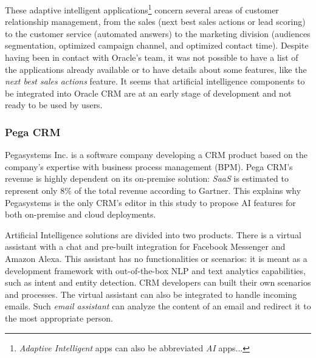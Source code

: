 These adaptive intelligent applications\footnote{\textit{Adaptive Intelligent} apps can also be abbreviated \textit{AI} apps...} concern several areas of customer relationship management, from the sales (next best sales actions or lead scoring) to the customer service (automated answers) to the marketing division (audiences segmentation, optimized campaign channel, and optimized contact time). Despite having been in contact with Oracle's team, it was not possible to have a list of the applications already available or to have details about some features, like the \textit{next best sales actions} feature. It seems that artificial intelligence components to be integrated into Oracle CRM are at an early stage of development and not ready to be used by users. 


\subsubsection*{Pega CRM}
Pegasystems Inc. is a software company developing a CRM product based on the company's expertise with business process management (BPM). Pega CRM's revenue is highly dependent on its on-premise solution: \textit{SaaS} is estimated to represent only 8\% of the total revenue according to Gartner. This explains why Pegasystems is the only CRM's editor in this study to propose AI features for both on-premise and cloud deployments.

Artificial Intelligence solutions are divided into two products. There is a virtual assistant with a chat and pre-built integration for Facebook Messenger and Amazon Alexa. This assistant has no functionalities or scenarios: it is meant as a development framework with out-of-the-box NLP and text analytics capabilities, such as intent and entity detection. CRM developers can built their own scenarios and processes. The virtual assistant can also be integrated to handle incoming emails. Such \textit{email assistant} can analyze the content of an email and redirect it to the most appropriate person.

